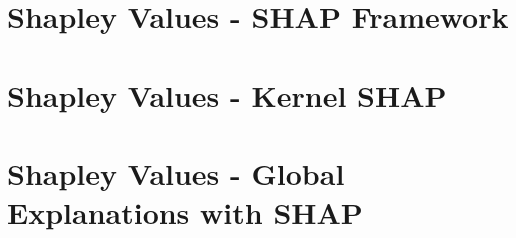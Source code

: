 \documentclass[11pt,compress,t,notes=noshow, aspectratio=169, xcolor=table]{beamer}
\begin{document}



% 
% 
% 

\section{Shapley Values - SHAP Framework}


\section{Shapley Values - Kernel SHAP}


\section{Shapley Values - Global Explanations with SHAP}

\end{document}
